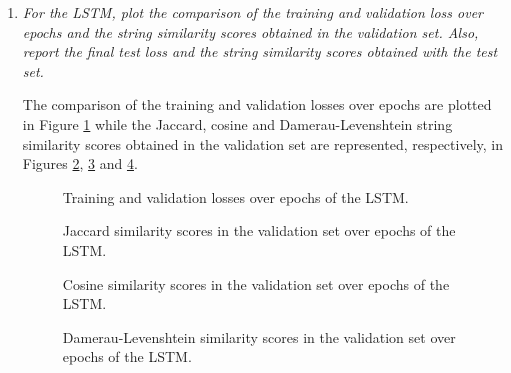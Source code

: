 \documentclass[12pt]{article}
\begin{document}
\begin{enumerate}[leftmargin=\labelsep]

    \item \textit{For the LSTM, plot the comparison of the training and validation loss over epochs and the string similarity scores obtained in the validation set. Also, report the final test loss and the string similarity scores obtained with the test set.}

          \vspace{12pt}

          The comparison of the training and validation losses over epochs are plotted in Figure \ref{fig:attention-rnn-loss-comparison} while the Jaccard, cosine and Damerau-Levenshtein string similarity scores obtained in the validation set are represented, respectively, in Figures \ref{fig:attention-rnn-jaccard}, \ref{fig:attention-rnn-cosine} and \ref{fig:attention-rnn-damerau-levenshtein}.

          \begin{figure}[H]
              \centering
              
              \caption{Training and validation losses over epochs of the LSTM.}
              \label{fig:attention-rnn-loss-comparison}
          \end{figure}

          \begin{figure}[H]
              \centering
              
              \caption{Jaccard similarity scores in the validation set over epochs of the LSTM.}
              \label{fig:attention-rnn-jaccard}
          \end{figure}

          \begin{figure}[H]
              \centering
              
              \caption{Cosine similarity scores in the validation set over epochs of the LSTM.}
              \label{fig:attention-rnn-cosine}
          \end{figure}

          \begin{figure}[H]
              \centering
              
              \caption{Damerau-Levenshtein similarity scores in the validation set over epochs of the LSTM.}
              \label{fig:attention-rnn-damerau-levenshtein}
          \end{figure}


\end{enumerate}
\end{document}
